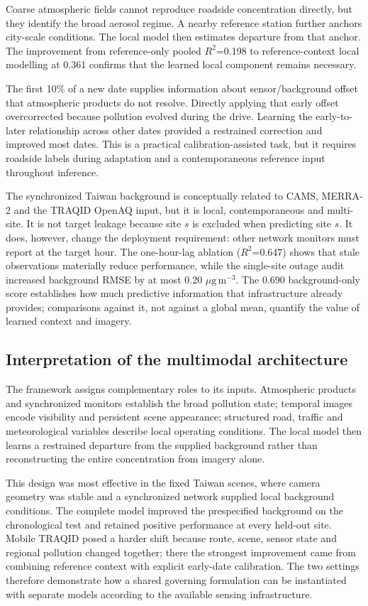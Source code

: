 \documentclass[review,12pt,authoryear]{elsarticle}
\newcommand{\ugm}{\ensuremath{\mu\mathrm{g}\,\mathrm{m}^{-3}}}
\newcommand{\Rtwo}{\ensuremath{R^2}}
\begin{document}
Coarse atmospheric fields cannot reproduce roadside concentration directly,
but they identify the broad aerosol regime. A nearby reference station further
anchors city-scale conditions. The local model then estimates departure from
that anchor. The improvement from reference-only pooled \Rtwo=0.198 to
reference-context local modelling at 0.361 confirms that the learned local
component remains necessary.

The first 10\% of a new date supplies information about sensor/background
offset that atmospheric products do not resolve. Directly applying that early
offset overcorrected because pollution evolved during the drive. Learning the
early-to-later relationship across other dates provided a restrained correction
and improved most dates. This is a practical calibration-assisted task, but it
requires roadside labels during adaptation and a contemporaneous reference
input throughout inference.

The synchronized Taiwan background is conceptually related to CAMS, MERRA-2
and the TRAQID OpenAQ input, but it is local, contemporaneous and multi-site.
It is not target leakage because site $s$ is excluded when predicting site $s$.
It does, however, change the deployment requirement: other network monitors
must report at the target hour. The one-hour-lag ablation (\Rtwo=0.647) shows
that stale observations materially reduce performance, while the single-site
outage audit increased background RMSE by at most 0.20 \ugm. The 0.690
background-only score establishes how much predictive information that
infrastructure already provides; comparisons against it, not against a global
mean, quantify the value of learned context and imagery.

\subsection{Interpretation of the multimodal architecture}

The framework assigns complementary roles to its inputs. Atmospheric products
and synchronized monitors establish the broad pollution state; temporal images
encode visibility and persistent scene appearance; structured road, traffic and
meteorological variables describe local operating conditions. The local model
then learns a restrained departure from the supplied background rather than
reconstructing the entire concentration from imagery alone.

This design was most effective in the fixed Taiwan scenes, where camera geometry
was stable and a synchronized network supplied local background conditions. The
complete model improved the prespecified background on the chronological test
and retained positive performance at every held-out site. Mobile TRAQID posed
a harder shift because route, scene, sensor state and regional pollution changed
together; there the strongest improvement came from combining reference context
with explicit early-date calibration. The two settings therefore demonstrate
how a shared governing formulation can be instantiated with separate models
according to the available sensing infrastructure.
\end{document}
